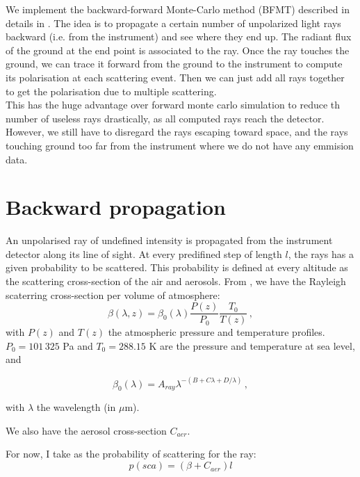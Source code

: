 \documentclass{article}
\begin{document}
We implement the backward-forward Monte-Carlo method (BFMT) described in details in \cite{yong2016}.
The idea is to propagate a certain number of unpolarized light rays backward (i.e. from the instrument) and see where they end up.
The radiant flux of the ground at the end point is associated to the ray.
Once the ray touches the ground, we can trace it forward from the ground to the instrument to compute its polarisation at each scattering event.
Then we can just add all rays together to get the polarisation due to multiple scattering.\\

This has the huge advantage over forward monte carlo simulation to reduce th number of useless rays drastically, as all computed rays reach the detector. However, we still have to disregard the rays escaping toward space, and the rays touching ground too far from the instrument where we do not have any emmision data.\\

\section{Backward propagation}

An unpolarised ray of undefined intensity is propagated from the instrument detector along its line of sight.
At every predifined step of length $l$, the rays has a given probability to be scattered.
This probability is defined at every altitude as the scattering cross-section of the air and aerosols.
From \cite{bucholtz1995}, we have the Rayleigh scaterring cross-section per volume of atmosphere:
\begin{equation}
\beta(\lambda, z) = \beta_0(\lambda) \frac{P(z)}{P_0} \frac{T_0}{T(z)}\,,
  \label{eq:beta_z}
\end{equation}
with $P(z)$ and $T(z)$ the atmospheric pressure and temperature profiles.
$P_0 = 101\,325$ Pa and $T_0 = 288.15$ K are the pressure and temperature at sea level, and
\begin{linenomath*}\begin{equation}
    \beta_0(\lambda) = A_{ray}\lambda^{-(B+C\lambda + D/\lambda)}\,,
    \label{eqn:sqlaw}
\end{equation}\end{linenomath*}
with $\lambda$ the wavelength (in $\mu$m).

We also have the aerosol cross-section $C_{aer}$.

For now, I take as the probability of scattering for the ray:
\begin{equation}
  p(sca) = (\beta + C_{aer}) l
\end{equation}
\end{document}
